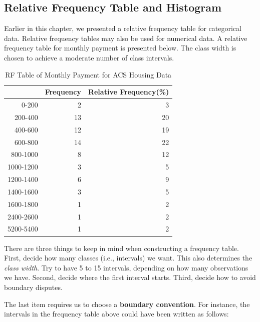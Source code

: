 \documentclass[11pt, chapterprefix=true]{scrbook}\usepackage[]{graphicx}\usepackage[]{color}
\begin{document}
\subsection{Relative Frequency Table and Histogram}

Earlier in this chapter, we presented a relative frequency table for categorical data.  Relative frequency tables may also be used for numerical data.  A relative frequency table for monthly payment is presented below.  The class width is chosen to achieve a moderate number of class intervals.

{\small{
\begin{table}[ht]
\centering
\begin{tabular}{rrr}
  \hline
 & Frequency & Relative Frequency(\%) \\ 
  \hline
0-200 & 2 & 3 \\ 
  200-400 & 13 & 20 \\ 
  400-600 & 12 & 19 \\ 
  600-800 & 14 & 22 \\ 
  800-1000 & 8 & 12 \\ 
  1000-1200 & 3 & 5 \\ 
  1200-1400 & 6 & 9 \\ 
  1400-1600 & 3 & 5 \\ 
  1600-1800 & 1 & 2 \\ 
  2400-2600 & 1 & 2 \\ 
  5200-5400 & 1 & 2 \\ 
   \hline
\end{tabular}
\caption{RF Table of Monthly Payment for ACS Housing Data} 
\end{table}

}}

There are three things to keep in mind when constructing a frequency table. First, decide how many classes (i.e., intervals) we want.  This also determines the \textit{class width}.  Try to have 5 to 15 intervals, depending on how many observations we have. Second, decide where the first interval starts.  Third, decide how to avoid boundary disputes.

The last item requires us to choose a \textbf{boundary convention}.  For instance, the intervals in the frequency table above could have been written as follows:
\end{document}

